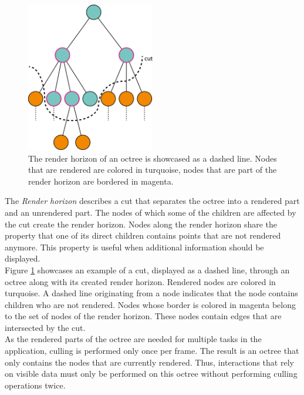 \begin{figure}
    \centering
    \includegraphics[width=0.5\textwidth]{Octree/renderHorizon.png}
    \caption[Illustration of the render horizon of an octree.]
		{The render horizon of an octree is showcased as a dashed line. Nodes that are rendered are colored in turquoise, nodes that are part of the render horizon are bordered in magenta. }
    \label{fig:renderHorizon}
\end{figure}


The \textit{Render horizon} describes a cut that separates the octree into a rendered part and an unrendered part. The nodes of which some of the children are affected by the cut create the render horizon. Nodes along the render horizon share the property that one of its direct children contains points that are not rendered anymore. This property is useful when additional information should be displayed. 
\\
Figure \ref{fig:renderHorizon} showcases an example of a cut, displayed as a dashed line, through an octree along with its created render horizon. Rendered nodes are colored in turquoise. A dashed line originating from a node indicates that the node contains children who are not rendered. Nodes whose border is colored in magenta belong to the set of nodes of the render horizon. These nodes contain edges that are intersected by the cut. 
\\
As the rendered parts of the octree are needed for multiple tasks in the application, culling is performed only once per frame. The result is an octree that only contains the nodes that are currently rendered. Thus, interactions that rely on visible data must only be performed on this octree without performing culling operations twice. 